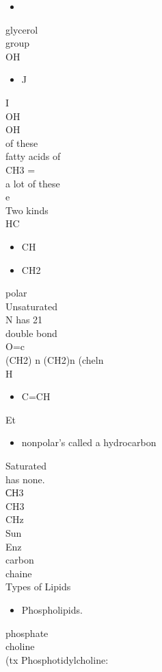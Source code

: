 \documentclass{article}
\begin{document}
\begin{itemize}\item 
\end{itemize}
glycerol\\
group\\
OH\\
\begin{itemize}\item  J
\end{itemize}
I\\
OH\\
OH\\
of these\\
fatty acids of\\
CH3 =\\
a lot of these\\
e\\
Two kinds\\
HC\begin{itemize}\item  CH \item  CH2
\end{itemize}
polar\\
Unsaturated\\
N has 21\\
double bond\\
O=c\\
(CH2) n (CH2)n (cheln\\
H\begin{itemize}\item C=CH
\end{itemize}
Et\\
\begin{itemize}\item nonpolar's
called a hydrocarbon
\end{itemize}
Saturated\\
has none.\\
СН3\\
CH3\\
CHz\\
Sun\\
Enz\\
carbon\\
chaine\\
Types of Lipids\\
\begin{itemize}\item  Phospholipids.
\end{itemize}
phosphate\\
choline\\
(tx Phosphotidylcholine:\\
\end{document}
